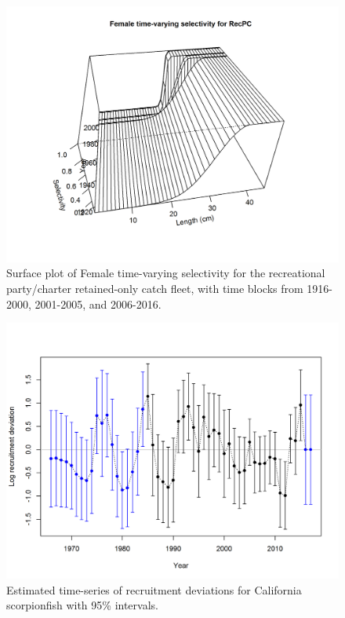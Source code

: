 \documentclass[12pt,]{article}
\begin{document}
\begin{figure}[htbp]
\centering
\includegraphics{r4ss/plots_mod1/sel03_len_timevary_surf_flt5sex1.png}
\caption{Surface plot of Female time-varying selectivity for the
recreational party/charter retained-only catch fleet, with time blocks
from 1916-2000, 2001-2005, and 2006-2016.
\label{fig:sel03_len_timevary_surf_flt5sex1}}
\end{figure}

\FloatBarrier

\begin{figure}[htbp]
\centering
\includegraphics{r4ss/plots_mod1/recdevs2_withbars.png}
\caption{Estimated time-series of recruitment deviations for California
scorpionfish with 95\% intervals. \label{fig:recdevs2_withbars}}
\end{figure}
\end{document}
